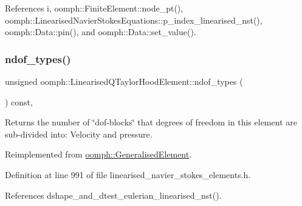 References i, oomph\+::\+Finite\+Element\+::node\+\_\+pt(), oomph\+::\+Linearised\+Navier\+Stokes\+Equations\+::p\+\_\+index\+\_\+linearised\+\_\+nst(), oomph\+::\+Data\+::pin(), and oomph\+::\+Data\+::set\+\_\+value().

\mbox{\label{classoomph_1_1LinearisedQTaylorHoodElement_a2cd2df4e56d4bd418e63ce1d15336082}} 
\subsubsection{\texorpdfstring{ndof\+\_\+types()}{ndof\_types()}}
{\footnotesize\ttfamily unsigned oomph\+::\+Linearised\+Q\+Taylor\+Hood\+Element\+::ndof\+\_\+types (\begin{DoxyParamCaption}{ }\end{DoxyParamCaption}) const\hspace{0.3cm}{\ttfamily [inline]}, {\ttfamily [virtual]}}



Returns the number of \char`\"{}dof-\/blocks\char`\"{} that degrees of freedom in this element are sub-\/divided into\+: Velocity and pressure. 



Reimplemented from \hyperlink{classoomph_1_1GeneralisedElement_a0c6037a870597b35dcf1c780710b9a56}{oomph\+::\+Generalised\+Element}.



Definition at line 991 of file linearised\+\_\+navier\+\_\+stokes\+\_\+elements.\+h.



References dshape\+\_\+and\+\_\+dtest\+\_\+eulerian\+\_\+linearised\+\_\+nst().

\mbox{\label{classoomph_1_1LinearisedQTaylorHoodElement_a39fbc88bf3d2d013337c1a5009e0168f}} 
